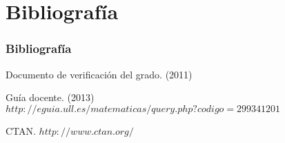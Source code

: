 \documentclass{beamer}
\begin{document}
\section{Bibliografía}
\begin{frame}
  \frametitle{Bibliografía}

  \begin{thebibliography}{10}

    \beamertemplatebookbibitems
    Documento de verificación del grado. 
    (2011) 

    \beamertemplatebookbibitems
    Guía docente. 
    (2013) 
    {\small $http://eguia.ull.es/matematicas/query.php?codigo=299341201$}

    \beamertemplatebookbibitems
    CTAN. {\small $http://www.ctan.org/$}

  \end{thebibliography}
\end{frame}

\end{document}
